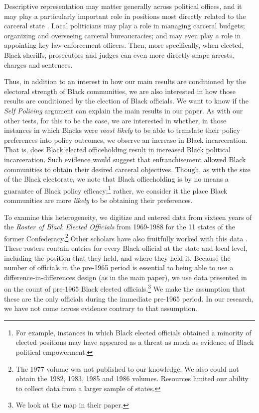 \documentclass[12pt]{article}
\begin{document}
Descriptive representation may matter generally across political offices, and it may play a particularly important role in positions most directly related to the carceral state .  Local politicians may play a role in managing carceral budgets; organizing and overseeing carceral bureaucracies; and may even play a role in appointing key law enforcement officers.  Then, more specifically, when elected, Black sheriffs, prosecutors and judges can even more directly shape arrests, charges and sentences.

Thus, in addition to an interest in how our main results are conditioned by the electoral strength of Black communities, we are also interested in how those results are conditioned by the election of Black officials.  We want to know if the \emph{Self Policing} argument can explain the main results in our paper.  As with our other tests, for this to be the case, we are interested in whether, in those instances in which Blacks were \emph{most likely} to be able to translate their policy preferences into policy outcomes, we observe an increase in Black incarceration.  That is, does Black elected officeholding result in increased Black political incarceration.  Such evidence would suggest that enfranchisement allowed Black communities to obtain their desired carceral objectives.  Though, as with the size of the Black electorate, we note that Black officeholding is by no means a guarantee of Black policy efficacy;\footnote{For example, instances in which Black elected officials obtained a minority of elected positions may have appeared as a threat as much as evidence of Black political empowerment. } rather, we consider it the place Black communities are more \emph{likely} to be obtaining their preferences.


To examine this heterogeneity, we digitize and entered data from sixteen years of the \emph{Roster of Black Elected Officials} from 1969-1988 for the 11 states of the former Confederacy.\footnote{The 1977 volume was not published to our knowledge.  We also could not obtain the 1982, 1983, 1985 and 1986 volumes.  Resources limited our ability to collect data from a larger sample of states.}  Other scholars have also fruitfully worked with this data . These rosters contain entries for every Black official at the state and local level, including the position that they held, and where they held it.  Because the number of officials in the pre-1965 period is essential to being able to use a difference-in-differences design (as in the main paper), we use data presented in  on the count of pre-1965 Black elected officials.\footnote{We look at the map in their paper.}  We make the assumption that these are the only officials during the immediate pre-1965 period.  In our research, we have not come across evidence contrary to that assumption.
\end{document}
